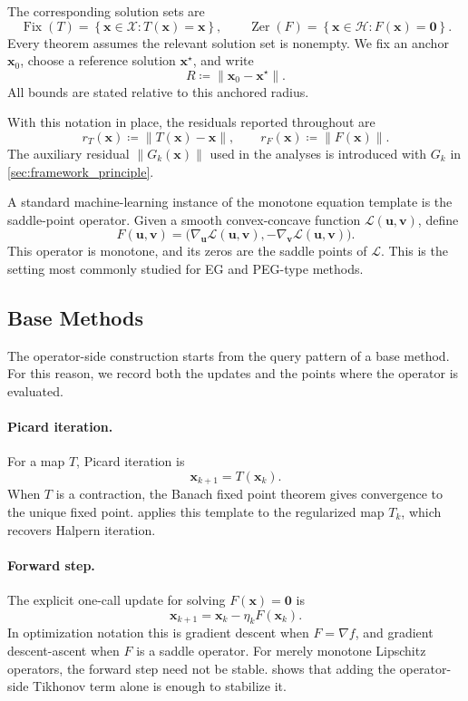 \documentclass[letterpaper,11pt]{article}
\newcommand{\norm}[1]{\left\| #1 \right\|}
\newcommand{\braces}[1]{\left\{ #1 \right \}}
\newcommand{\vect}[1]{\mathbf{#1}}
\begin{document}
The corresponding solution sets are
\[
    \operatorname{Fix}(T)
    =
    \braces{\vect{x}\in\mathcal X:T(\vect{x})=\vect{x}},
    \qquad
    \operatorname{Zer}(F)
    =
    \braces{\vect{x}\in\mathcal H:F(\vect{x})=\vect{0}}.
\]
Every theorem assumes the relevant solution set is nonempty. We fix an anchor
\(\vect{x}_0\), choose a reference solution \(\vect{x}^\star\), and write
\[
    R\coloneqq\norm{\vect{x}_0-\vect{x}^\star}.
\]
All bounds are stated relative to this anchored radius.

With this notation in place, the residuals reported throughout are
\[
    r_T(\vect{x})\coloneqq\norm{T(\vect{x})-\vect{x}},
    \qquad
    r_F(\vect{x})\coloneqq\norm{F(\vect{x})}.
\]
The auxiliary residual \(\norm{G_k(\vect{x})}\) used in the
analyses is introduced with \(G_k\) in \cref{sec:framework_principle}.

A standard machine-learning instance of the monotone equation template is the
saddle-point operator. Given a smooth convex-concave function
\(\mathcal L(\vect{u},\vect{v})\), define
\[
    F(\vect{u},\vect{v})
    =\bigl(\nabla_{\vect{u}}\mathcal L(\vect{u},\vect{v}),
           -\nabla_{\vect{v}}\mathcal L(\vect{u},\vect{v})\bigr).
\]
This operator is monotone, and its zeros are the saddle points of
\(\mathcal L\). This is the setting most commonly studied for EG and
PEG-type methods.


\subsection{Base Methods}

The operator-side construction starts from the query pattern of a base method.
For this reason, we record both the updates and the points where the operator is
evaluated.

\paragraph{Picard iteration.}
For a map \(T\), Picard iteration is
\begin{equation}\label{eq:picard_iteration}
    \vect{x}_{k+1}=T(\vect{x}_k).
\end{equation}
When \(T\) is a contraction, the Banach fixed point theorem gives convergence to
the unique fixed point.  applies this
template to the regularized map \(T_k\), which recovers Halpern iteration.

\paragraph{Forward step.}
The explicit one-call update for solving \(F(\vect{x})=\vect{0}\) is
\begin{equation}\label{eq:forward_step_std}
    \vect{x}_{k+1}
    =
    \vect{x}_k-\eta_kF(\vect{x}_k).
\end{equation}
In optimization notation this is gradient descent when \(F=\nabla f\), and
gradient descent-ascent when \(F\) is a saddle operator. For merely monotone
Lipschitz operators, the forward step need not be stable.
 shows that adding the operator-side Tikhonov term
alone is enough to stabilize it.
\end{document}
